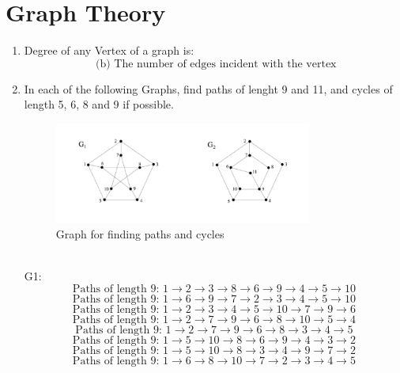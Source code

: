 \documentclass[a3paper,12pt]{extarticle} %
\begin{document}
\section{Graph Theory}
\begin{enumerate}
    \item Degree of any Vertex of a graph is:
    \[
        \text{ (b) The number of edges incident with the vertex}
    \]
    \item In each of the following Graphs, find paths of lenght 9 and 11, and cycles of length 5, 6, 8 and 9 if possible.
    \begin{figure}[h!]
        \centering
        \includegraphics[width=0.8\textwidth]{PGM-graph.png}
        \caption{Graph for finding paths and cycles}
        \label{fig:pgm-graph}
    \end{figure}
    \\
    G1:
    \[
        \text{Paths of length 9: } 1 \rightarrow 2 \rightarrow 3 \rightarrow 8\rightarrow 6 \rightarrow 9 \rightarrow 4 \rightarrow 5 \rightarrow 10
    \]
    \[
        \text{Paths of length 9: } 1 \rightarrow 6 \rightarrow 9 \rightarrow 7\rightarrow 2 \rightarrow 3 \rightarrow 4 \rightarrow 5 \rightarrow 10
    \]
    \[
        \text{Paths of length 9: } 1 \rightarrow 2 \rightarrow 3 \rightarrow 4 \rightarrow 5 \rightarrow 10 \rightarrow 7 \rightarrow 9 \rightarrow 6
    \]
    \[
        \text{Paths of length 9: } 1 \rightarrow 2 \rightarrow 7 \rightarrow 9 \rightarrow 6 \rightarrow 8 \rightarrow 10 \rightarrow 5 \rightarrow 4
    \]
    \[
        \text{Paths of length 9: } 1 \rightarrow 2 \rightarrow 7 \rightarrow 9 \rightarrow 6 \rightarrow 8 \rightarrow 3 \rightarrow 4 \rightarrow 5
    \]
    \[
        \text{Paths of length 9: } 1 \rightarrow 5 \rightarrow 10 \rightarrow 8 \rightarrow 6 \rightarrow 9 \rightarrow 4 \rightarrow 3 \rightarrow 2
    \]
    \[
        \text{Paths of length 9: } 1 \rightarrow 5 \rightarrow 10 \rightarrow 8 \rightarrow 3 \rightarrow 4 \rightarrow 9 \rightarrow 7 \rightarrow 2
    \]
    \[
        \text{Paths of length 9: } 1 \rightarrow 6 \rightarrow 8 \rightarrow 10 \rightarrow 7 \rightarrow 2 \rightarrow 3 \rightarrow 4 \rightarrow 5
\]
\end{enumerate}
\end{document}
